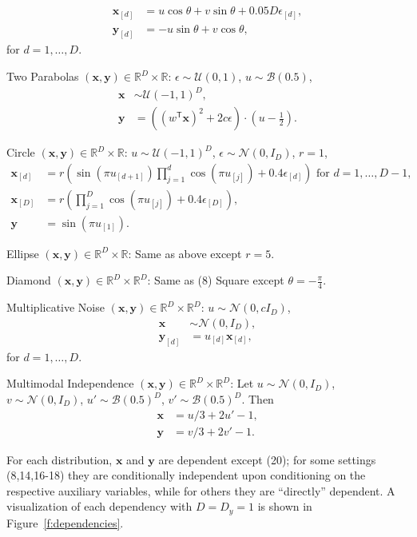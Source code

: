 \documentclass[11pt]{article}
\providecommand{\mb}[1]{\boldsymbol{#1}}
\providecommand{\mc}[1]{\mathcal{#1}}
\newcommand{\Real}{\mathbb{R}}
\newcommand{\T}{^{\ensuremath{\mathsf{T}}}}           %
\newcommand{\mby}{\ensuremath{\mb{y}}}
\begin{document}
\begin{compactenum}
\begin{align*}
\mb{x}_{[d]}&=u \cos\theta + v \sin\theta + 0.05 D\epsilon_{[d]},\\
\mb{y}_{[d]}&=-u \sin\theta + v \cos\theta,
\end{align*}
for $d=1,\ldots,D$.
\item Two Parabolas $(\mb{x},\mb{y}) \in \Real^{D} \times \Real$: $\epsilon \sim \mc{U}(0,1)$, $u \sim \mc{B}(0.5)$,
\begin{align*}
\mb{x} &\sim \mc{U}(-1,1)^{D},\\
\mb{y}&=\left( (w\T \mb{x})^2  + 2c\epsilon\right) \cdot (u-\tfrac{1}{2}).
\end{align*}
\item Circle $(\mb{x},\mb{y}) \in \Real^{D} \times \Real$: $u \sim \mc{U}(-1,1)^{D}$, $\epsilon \sim \mc{N}(0, I_{D})$, $r=1$,
\begin{align*}
\mb{x}_{[d]}&=r \left(\sin(\pi u_{[d+1]})  \prod_{j=1}^{d} \cos(\pi u_{[j]})+0.4 \epsilon_{[d]}\right) \mbox{ for $d=1,\ldots,D-1$},\\
\mb{x}_{[D]}&=r \left(\prod_{j=1}^{D} \cos(\pi u_{[j]})+0.4 \epsilon_{[D]}\right),\\
\mb{y}&= \sin(\pi u_{[1]}).
\end{align*}
\item Ellipse $(\mb{x},\mb{y}) \in \Real^{D} \times \Real$: Same as above except $r=5$.
\item Diamond $(\mb{x},\mb{y}) \in \Real^{D} \times \Real^{D}$: Same as (8) Square except $\theta=-\frac{\pi}{4}$.
\item Multiplicative Noise $(\mb{x},\mb{y}) \in \Real^{D} \times \Real^{D}$: $u \sim \mc{N}(0, c I_{D})$, 
\begin{align*}
\mb{x} &\sim \mc{N}(0, I_{D}),\\
\mb{y}_{[d]}&=u_{[d]}\mb{x}_{[d]},
\end{align*}
for $d=1,\ldots,D$.
\item Multimodal Independence $(\mb{x},\mb{y}) \in \Real^{D} \times \Real^{D}$: Let $u \sim \mc{N}(0,I_{D})$, $v \sim \mc{N}(0,I_{D})$, $u' \sim \mc{B}(0.5)^{D}$, $v' \sim \mc{B}(0.5)^{D}$. Then
\begin{align*}
\mb{x}&=u/3+2u'-1,\\
\mb{y}&=v/3+2v'-1.
\end{align*}
\end{compactenum}

For each distribution, $\mb{x}$ and $\mb{y}$ are dependent except  (20); for some settings (8,14,16-18) they are conditionally independent upon conditioning on the respective auxiliary variables, while for others they are
 ``directly'' dependent. 
A visualization of each dependency with $D=D_y=1$ is shown in Figure~\ref{f:dependencies}.
\end{document}
